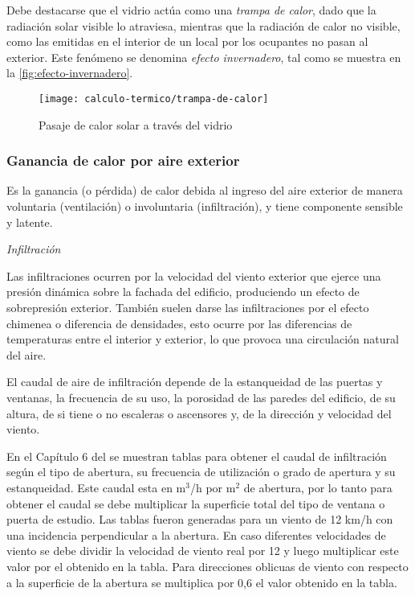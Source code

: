 Debe destacarse que el vidrio actúa como una \emph{trampa de calor}, dado que la radiación solar visible lo atraviesa, mientras que la radiación de calor no visible, como las emitidas en el interior de un local por los ocupantes no pasan al exterior. Este fenómeno se denomina \emph{efecto invernadero}, tal como se muestra en la \autoref{fig:efecto-invernadero}.

\begin{figure}
	\centering
	\caption{Pasaje de calor solar a través del vidrio}
	\label{fig:efecto-invernadero}
	\texttt{[image: calculo-termico/trampa-de-calor]}
\end{figure}

\subsubsection{Ganancia de calor por aire exterior}
Es la ganancia (o p\'erdida) de calor debida al ingreso del aire exterior de manera voluntaria (ventilaci\'on) o involuntaria (infiltraci\'on), y tiene componente sensible y latente.

\emph{Infiltraci\'on}

Las infiltraciones ocurren por la velocidad del viento exterior que ejerce una presi\'on din\'amica sobre la fachada del edificio, produciendo un efecto de sobrepresi\'on exterior. Tambi\'en suelen darse las infiltraciones por el efecto chimenea o diferencia de densidades, esto ocurre por las diferencias de temperaturas entre el interior y exterior, lo que provoca una circulaci\'on natural del aire.

El caudal de aire de infiltraci\'on depende de la estanqueidad de las puertas y ventanas, la frecuencia de su uso, la porosidad de las paredes del edificio, de su altura, de si tiene o no escaleras o ascensores y, de la direcci\'on y velocidad del viento.

En el Cap\'itulo 6 del  se muestran tablas para obtener el caudal de infiltraci\'on seg\'un el tipo de abertura, su frecuencia de utilizaci\'on o grado de apertura y su estanqueidad. Este caudal esta en m$^3$/h por m$^2$ de abertura, por lo tanto para obtener el caudal se debe multiplicar la superficie total del tipo de ventana o puerta de estudio. Las tablas fueron generadas para un viento de 12 km/h con una incidencia perpendicular a la abertura. En caso diferentes velocidades de viento se debe dividir la velocidad de viento real por 12 y luego multiplicar este valor por el obtenido en la tabla. Para direcciones oblicuas de viento con respecto a la superficie de la abertura se multiplica por 0,6 el valor obtenido en la tabla.

